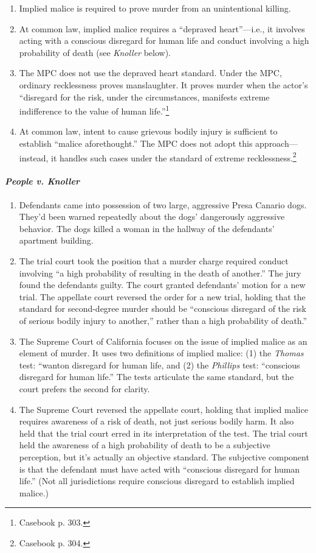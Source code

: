 \begin{enumerate}
    \item Implied malice is required to prove murder from an unintentional killing.
    \item At common law, implied malice requires a ``depraved heart''---i.e., it involves acting with a conscious disregard for human life and conduct involving a high probability of death (see \emph{Knoller} below).
    \item The MPC does not use the depraved heart standard. Under the MPC, ordinary recklessness proves manslaughter. It proves murder when the actor's ``disregard for the risk, under the circumstances, manifests extreme indifference to the value of human life.''\footnote{Casebook p. 303.} 
    \item At common law, intent to cause grievous bodily injury is sufficient to establish ``malice aforethought.'' The MPC does not adopt this approach---instead, it handles such cases under the standard of extreme recklessness.\footnote{Casebook p. 304.}
\end{enumerate}

\paragraph{\emph{People v. Knoller}}

\begin{enumerate}
    \item Defendants came into possession of two large, aggressive Presa Canario dogs. They'd been warned repeatedly about the dogs' dangerously aggressive behavior. The dogs killed a woman in the hallway of the defendants' apartment building.
    \item The trial court took the position that a murder charge required conduct involving ``a high probability of resulting in the death of another.'' The jury found the defendants guilty. The court granted defendants' motion for a new trial. The appellate court reversed the order for a new trial, holding that the standard for second-degree murder should be ``conscious disregard of the risk of serious bodily injury to another,'' rather than a high probability of death.''
    \item The Supreme Court of California focuses on the issue of implied malice as an element of murder. It uses two definitions of implied malice: (1) the \emph{Thomas} test: ``wanton disregard for human life, and (2) the \emph{Phillips} test: ``conscious disregard for human life.'' The tests articulate the same standard, but the court prefers the second for clarity.
    \item The Supreme Court reversed the appellate court, holding that implied malice requires awareness of a risk of death, not just serious bodily harm. It also held that the trial court erred in its interpretation of the test. The trial court held the awareness of a high probability of death to be a subjective perception, but it's actually an objective standard. The subjective component is that the defendant must have acted with ``conscious disregard for human life.'' (Not all jurisdictions require conscious disregard to establish implied malice.)
\end{enumerate}

